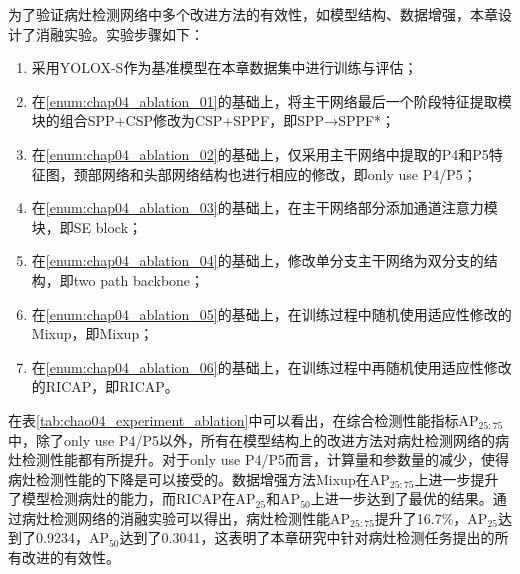 为了验证病灶检测网络中多个改进方法的有效性，如模型结构、数据增强，本章设计了消融实验。实验步骤如下：
\begin{enumerate}[(1)]
  \item 采用YOLOX-S作为基准模型在本章数据集中进行训练与评估；\label{enum:chap04_ablation_01}
  \item 在\ref{enum:chap04_ablation_01}的基础上，将主干网络最后一个阶段特征提取模块的组合SPP+CSP修改为CSP+SPPF，即SPP→SPPF*；\label{enum:chap04_ablation_02}
  \item 在\ref{enum:chap04_ablation_02}的基础上，仅采用主干网络中提取的P4和P5特征图，颈部网络和头部网络结构也进行相应的修改，即only use P4/P5；\label{enum:chap04_ablation_03}
  \item 在\ref{enum:chap04_ablation_03}的基础上，在主干网络部分添加通道注意力模块，即SE block；\label{enum:chap04_ablation_04}
  \item 在\ref{enum:chap04_ablation_04}的基础上，修改单分支主干网络为双分支的结构，即two path backbone；\label{enum:chap04_ablation_05}
  \item 在\ref{enum:chap04_ablation_05}的基础上，在训练过程中随机使用适应性修改的Mixup，即Mixup；\label{enum:chap04_ablation_06}
  \item 在\ref{enum:chap04_ablation_06}的基础上，在训练过程中再随机使用适应性修改的RICAP，即RICAP。
\end{enumerate}

在表\ref{tab:chao04_experiment_ablation}中可以看出，在综合检测性能指标AP\(_{25:75}\)中，除了only use P4/P5以外，所有在模型结构上的改进方法对病灶检测网络的病灶检测性能都有所提升。对于only use P4/P5而言，计算量和参数量的减少，使得病灶检测性能的下降是可以接受的。数据增强方法Mixup在AP\(_{25:75}\)上进一步提升了模型检测病灶的能力，而RICAP在AP\(_{25}\)和AP\(_{50}\)上进一步达到了最优的结果。通过病灶检测网络的消融实验可以得出，病灶检测性能AP\(_{25:75}\)提升了16.7\%，AP\(_{25}\)达到了0.9234，AP\(_{50}\)达到了0.3041，这表明了本章研究中针对病灶检测任务提出的所有改进的有效性。

